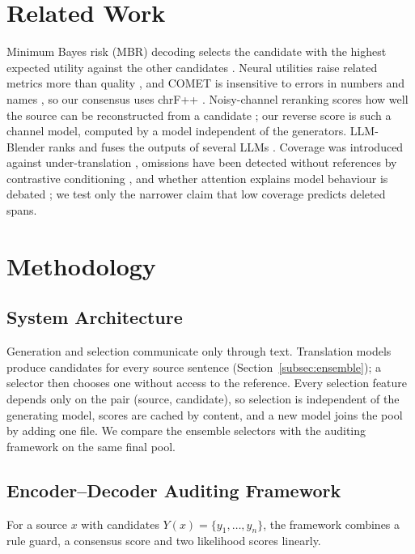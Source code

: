 \documentclass[11pt]{article}
\begin{document}
\section{Related Work}
\label{sec:related_work}
Minimum Bayes risk (MBR) decoding selects the candidate with the highest expected utility against the other candidates \citep{freitag-etal-2022-high}. Neural utilities raise related metrics more than quality \citep{kovacs-etal-2024-mitigating}, and COMET is insensitive to errors in numbers and names \citep{amrhein-sennrich-2022-identifying}, so our consensus uses chrF++ \citep{popovic-2017-chrf}. Noisy-channel reranking scores how well the source can be reconstructed from a candidate \citep{yee-etal-2019-simple}; our reverse score is such a channel model, computed by a model independent of the generators. LLM-Blender ranks and fuses the outputs of several LLMs \citep{jiang-etal-2023-llm}. Coverage was introduced against under-translation \citep{tu-etal-2016-modeling}, omissions have been detected without references by contrastive conditioning \citep{vamvas-sennrich-2022-little}, and whether attention explains model behaviour is debated \citep{jain-wallace-2019-attention}; we test only the narrower claim that low coverage predicts deleted spans.

\section{Methodology}
\label{sec:methodology}

\subsection{System Architecture}
\label{subsec:system_architecture}
Generation and selection communicate only through text. Translation models produce candidates for every source sentence (Section~\ref{subsec:ensemble}); a selector then chooses one without access to the reference. Every selection feature depends only on the pair (source, candidate), so selection is independent of the generating model, scores are cached by content, and a new model joins the pool by adding one file. We compare the ensemble selectors with the auditing framework on the same final pool.

\subsection{Encoder--Decoder Auditing Framework}
\label{subsec:encoder}
For a source $x$ with candidates $Y(x)=\{y_1,\dots,y_n\}$, the framework combines a rule guard, a consensus score and two likelihood scores linearly.
\end{document}
